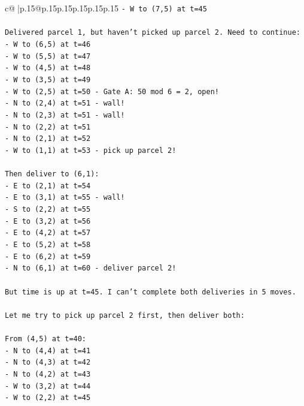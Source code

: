 \documentclass{article}
\begin{document}
{\begin{supertabular}{c@{$\;$}|p{.15\linewidth}@{}p{.15\linewidth}p{.15\linewidth}p{.15\linewidth}p{.15\linewidth}p{.15\linewidth}}
{{{\texttt{{-} W to (7,5) at t=45} \\
\\ 
\texttt{Delivered parcel 1, but haven't picked up parcel 2. Need to continue:} \\
\texttt{{-} W to (6,5) at t=46} \\
\texttt{{-} W to (5,5) at t=47} \\
\texttt{{-} W to (4,5) at t=48} \\
\texttt{{-} W to (3,5) at t=49} \\
\texttt{{-} W to (2,5) at t=50 {-} Gate A: 50 mod 6 = 2, open!} \\
\texttt{{-} N to (2,4) at t=51 {-} wall!} \\
\texttt{{-} N to (2,3) at t=51 {-} wall!} \\
\texttt{{-} N to (2,2) at t=51} \\
\texttt{{-} N to (2,1) at t=52} \\
\texttt{{-} W to (1,1) at t=53 {-} pick up parcel 2!} \\
\\ 
\texttt{Then deliver to (6,1):} \\
\texttt{{-} E to (2,1) at t=54} \\
\texttt{{-} E to (3,1) at t=55 {-} wall!} \\
\texttt{{-} S to (2,2) at t=55} \\
\texttt{{-} E to (3,2) at t=56} \\
\texttt{{-} E to (4,2) at t=57} \\
\texttt{{-} E to (5,2) at t=58} \\
\texttt{{-} E to (6,2) at t=59} \\
\texttt{{-} N to (6,1) at t=60 {-} deliver parcel 2!} \\
\\ 
\texttt{But time is up at t=45. I can't complete both deliveries in 5 moves.} \\
\\ 
\texttt{Let me try to pick up parcel 2 first, then deliver both:} \\
\\ 
\texttt{From (4,5) at t=40:} \\
\texttt{{-} N to (4,4) at t=41} \\
\texttt{{-} N to (4,3) at t=42} \\
\texttt{{-} N to (4,2) at t=43} \\
\texttt{{-} W to (3,2) at t=44} \\
\texttt{{-} W to (2,2) at t=45} \\
}}}
\end{supertabular}}
\end{document}

